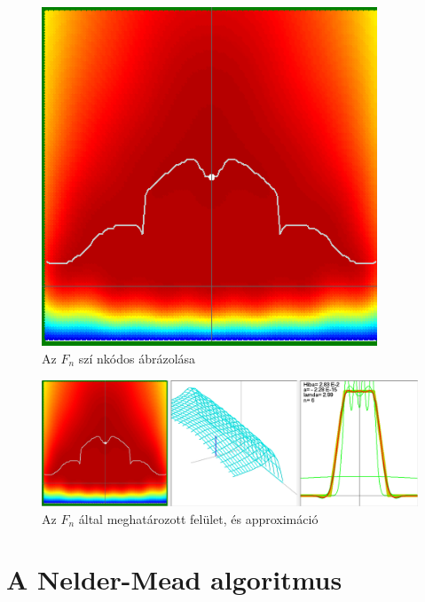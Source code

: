 \documentclass[oneside,titlepage,12pt,a4paper]{report}
\begin{document}
\begin{figure}[H]
\begin{center}
   \includegraphics[width=100mm]{./Abrak/Ereszkedo1/F_2sz.png}
  \caption{Az $F_n$ szí nkódos ábrázolása}
\end{center}
\end{figure}

\begin{figure}[H]
\begin{center}
   \includegraphics[width=140mm]{./Abrak/Ereszkedo1/Er36.png}
  \caption{Az $F_n$ által meghatározott felület, és approximáció}
\end{center}
\end{figure}

\section{A Nelder-Mead algoritmus} \label{sec::neldermead}
\end{document}
